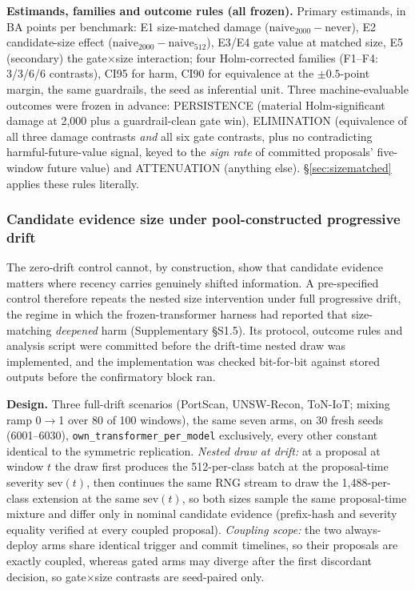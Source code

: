 \documentclass[journal]{IEEEtran}
\begin{document}
\textbf{Estimands, families and outcome rules (all frozen).} Primary estimands, in BA points per benchmark: E1 size-matched damage ($\mathrm{naive}_{2000}-\mathrm{never}$), E2 candidate-size effect ($\mathrm{naive}_{2000}-\mathrm{naive}_{512}$), E3/E4 gate value at matched size, E5 (secondary) the gate$\times$size interaction; four Holm-corrected families (F1--F4: 3/3/6/6 contrasts), CI95 for harm, CI90 for equivalence at the $\pm0.5$-point margin, the same guardrails, the seed as inferential unit. Three machine-evaluable outcomes were frozen in advance: PERSISTENCE (material Holm-significant damage at 2{,}000 plus a guardrail-clean gate win), ELIMINATION (equivalence of all three damage contrasts \emph{and} all six gate contrasts, plus no contradicting harmful-future-value signal, keyed to the \emph{sign rate} of committed proposals' five-window future value) and ATTENUATION (anything else). \S\ref{sec:sizematched} applies these rules literally.

\subsubsection{Candidate evidence size under pool-constructed progressive drift}
\label{sec:sizematched_drift_method}

The zero-drift control cannot, by construction, show that candidate evidence matters where recency carries genuinely shifted information. A pre-specified control therefore repeats the nested size intervention under full progressive drift, the regime in which the frozen-transformer harness had reported that size-matching \emph{deepened} harm (Supplementary \S S1.5). Its protocol, outcome rules and analysis script were committed before the drift-time nested draw was implemented, and the implementation was checked bit-for-bit against stored outputs before the confirmatory block ran.

\textbf{Design.} Three full-drift scenarios (PortScan, UNSW-Recon, ToN-IoT; mixing ramp 0$\to$1 over 80 of 100 windows), the same seven arms, on 30 fresh seeds (6001--6030), \texttt{own\_transformer\_per\_model} exclusively, every other constant identical to the symmetric replication. \emph{Nested draw at drift:} at a proposal at window $t$ the draw first produces the 512-per-class batch at the proposal-time severity $\mathrm{sev}(t)$, then continues the same RNG stream to draw the 1{,}488-per-class extension at the same $\mathrm{sev}(t)$, so both sizes sample the same proposal-time mixture and differ only in nominal candidate evidence (prefix-hash and severity equality verified at every coupled proposal). \emph{Coupling scope:} the two always-deploy arms share identical trigger and commit timelines, so their proposals are exactly coupled, whereas gated arms may diverge after the first discordant decision, so gate$\times$size contrasts are seed-paired only.
\end{document}
